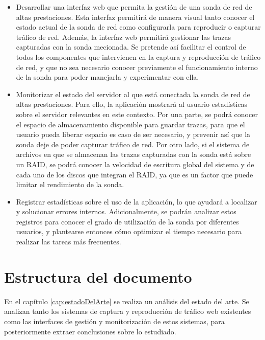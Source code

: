 \begin{itemize}
  \item Desarrollar una interfaz web que permita la gestión de una sonda de red de altas prestaciones. Esta interfaz permitirá de manera visual tanto conocer el estado actual de la sonda de red como configurarla para reproducir o capturar tráfico de red. Además, la interfaz web permitirá gestionar las \glspl{traza} capturadas con la sonda mecionada. Se pretende así facilitar el control de todos los componentes que intervienen en la captura y reproducción de tráfico de red, y que no sea necesario conocer previamente el funcionamiento interno de la sonda para poder manejarla y experimentar con ella.

  \item Monitorizar el estado del servidor al que está conectada la sonda de red de altas prestaciones. Para ello, la aplicación mostrará al usuario estadísticas sobre el servidor relevantes en este contexto. Por una parte, se podrá conocer el espacio de almacenamiento disponible para guardar \glspl{traza}, para que el usuario pueda liberar espacio es caso de ser necesario, y prevenir así que la sonda deje de poder capturar tráfico de red. Por otro lado, si el sistema de archivos en que se almacenan las \glspl{traza} capturadas con la sonda está sobre un \gls{RAID}, se podrá conocer la velocidad de escritura global del sistema y de cada uno de los discos que integran el \gls{RAID}, ya que es un factor que puede limitar el rendimiento de la sonda.

  \item Registrar estadísticas sobre el uso de la aplicación, lo que ayudará a localizar y solucionar errores internos. Adicionalmente, se podrán analizar estos registros para conocer el grado de utilización de la sonda por diferentes usuarios, y plantearse entonces cómo optimizar el tiempo necesario para realizar las tareas más frecuentes.
\end{itemize}

\section{Estructura del documento}

En el capítulo \ref{cap:estadoDelArte} se realiza un análisis del estado del arte. Se analizan tanto los sistemas de captura y reproducción de tráfico web existentes como las interfaces de gestión y monitorización de estos sistemas, para posteriormente extraer conclusiones sobre lo estudiado.

